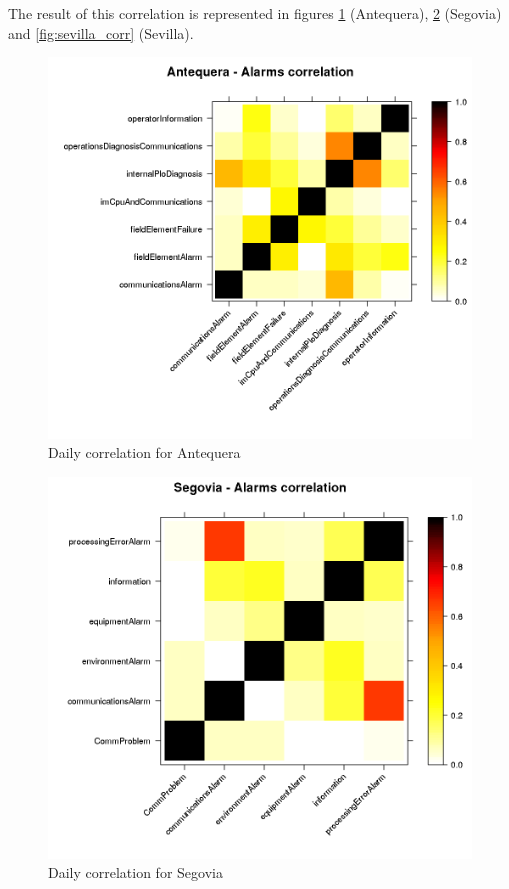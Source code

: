 \documentclass[a4paper,12pt]{article}
\begin{document}
The result of this correlation is represented in figures \ref{fig:anteq_corr} (Antequera), \ref{fig:segovia_corr} (Segovia) and \ref{fig:sevilla_corr} (Sevilla).

\begin{figure}[htb]
 \centering
 \includegraphics[width=\textwidth]{./img/antequera_corr.png}
 \caption{Daily correlation for Antequera} \label{fig:anteq_corr}
\end{figure}
\begin{figure}[htb]
 \centering
 \includegraphics[width=\textwidth]{./img/segovia_corr.png}
 \caption{Daily correlation for Segovia} \label{fig:segovia_corr}
\end{figure}
\end{document}
